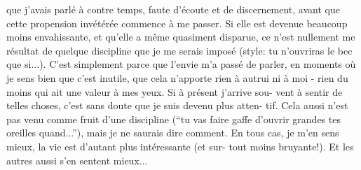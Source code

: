 que j'avais parlé à contre temps, faute d'écoute et de discernement, avant que
cette propension invétérée commence à me passer. Si elle est devenue beaucoup
moins envahissante, et qu'elle a même quasiment disparue, ce n'est nullement \linebreak
me résultat de quelque discipline que je me serais imposé (style: tu n'ouvriras
le bec que si...). C'est simplement parce que l'envie m'a passé de parler, en 
moments où je sens bien que c'est inutile, que cela n'apporte rien à autrui ni
à moi - rien du moins qui ait une valeur à mes yeux. Si à présent j'arrive sou-\linebreak
vent à sentir de telles choses, c'est sans doute que je suis devenu plus atten-\linebreak
tif. Cela aussi n'est pas venu comme fruit d'une discipline (``tu vas faire
gaffe d'ouvrir grandes tes oreilles quand...''), mais je ne saurais dire comment.
En tous cas, je m'en sens mieux, la vie est d'autant plus intéressante (et sur-\linebreak
tout moins bruyante!). Et les autres aussi s'en sentent mieux...

